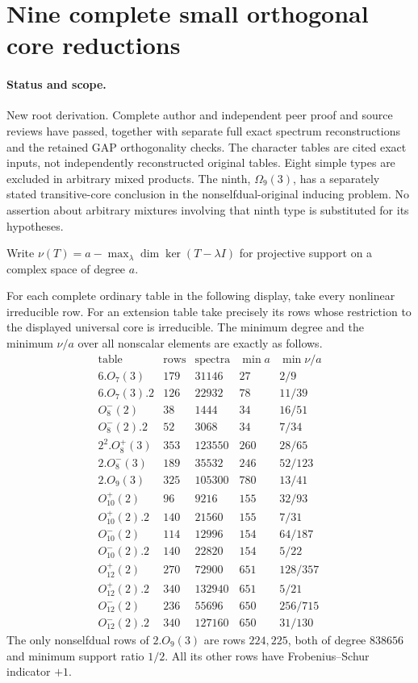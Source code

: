 \section{Nine complete small orthogonal core reductions}
\label{sec:orthogonal-small-cores}

\paragraph{Status and scope.}
New root derivation. Complete author and independent peer proof and
source reviews have passed, together with separate full exact spectrum
reconstructions and the retained GAP orthogonality checks. The character tables are
cited exact inputs, not independently reconstructed original tables.
Eight simple types are excluded in arbitrary mixed products. The ninth,
$\Omega_9(3)$, has a separately stated transitive-core conclusion in the
nonselfdual-original inducing problem. No assertion about arbitrary
mixtures involving that ninth type is substituted for its hypotheses.

Write $\nu(T)=a-\max_\lambda\dim\ker(T-\lambda I)$ for
projective support on a complex space of degree $a$.

\begin{lemma}
\label{D-OSM-01}
For each complete ordinary table in the following display, take every
nonlinear irreducible row. For an extension table take precisely its
rows whose restriction to the displayed universal core is irreducible.
The minimum degree and the minimum $\nu/a$ over all nonscalar elements
are exactly as follows.
\[
\begin{array}{l|r|r|r|c}
\text{table}&\text{rows}&\text{spectra}&\min a&\min\nu/a\\\hline
6.O_7(3)&179&31146&27&2/9\\
6.O_7(3).2&126&22932&78&11/39\\
O_8^-(2)&38&1444&34&16/51\\
O_8^-(2).2&52&3068&34&7/34\\
2^2.O_8^+(3)&353&123550&260&28/65\\
2.O_8^-(3)&189&35532&246&52/123\\
2.O_9(3)&325&105300&780&13/41\\
O_{10}^+(2)&96&9216&155&32/93\\
O_{10}^+(2).2&140&21560&155&7/31\\
O_{10}^-(2)&114&12996&154&64/187\\
O_{10}^-(2).2&140&22820&154&5/22\\
O_{12}^+(2)&270&72900&651&128/357\\
O_{12}^+(2).2&340&132940&651&5/21\\
O_{12}^-(2)&236&55696&650&256/715\\
O_{12}^-(2).2&340&127160&650&31/130
\end{array}                                                     \tag{OSM.1}
\]
The only nonselfdual rows of $2.O_9(3)$ are rows $224,225$,
both of degree $838656$ and minimum support ratio $1/2$.
All its other rows have Frobenius--Schur indicator $+1$.
\end{lemma}


